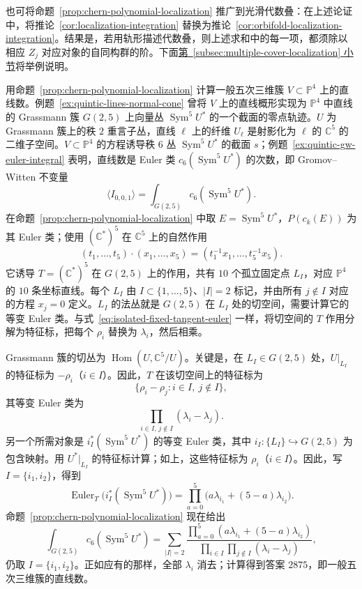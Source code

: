 也可将命题~\ref{prop:chern-polynomial-localization} 推广到光滑代数叠：在上述论证中，将推论~\ref{cor:localization-integration} 替换为推论~\ref{cor:orbifold-localization-integration}。结果是，若用轨形描述代数叠，则上述求和中的每一项，都须除以相应 $Z_j$ 对应对象的自同构群的阶。下面\hyperref[subsec:multiple-cover-localization]{第~\ref*{subsec:multiple-cover-localization} 小节}将举例说明。
\begin{example}\label{ex:quintic-lines-localization}
用命题~\ref{prop:chern-polynomial-localization} 计算一般五次三维簇 $V\subset\mathbb P^4$ 上的直线数。例题~\ref{ex:quintic-lines-normal-cone} 曾将 $V$ 上的直线概形实现为 $\mathbb P^4$ 中直线的 Grassmann 簇 $G(2,5)$ 上向量丛 $\operatorname{Sym}^5U^*$ 的一个截面的零点轨迹。$U$ 为 Grassmann 簇上的秩 $2$ 重言子丛，直线 $\ell$ 上的纤维 $U_\ell$ 是射影化为 $\ell$ 的 $\mathbb C^5$ 的二维子空间。$V\subset\mathbb P^4$ 的方程诱导秩 $6$ 丛 $\operatorname{Sym}^5U^*$ 的截面 $s$；例题~\ref{ex:quintic-gw-euler-integral} 表明，直线数是 Euler 类 $c_6(\operatorname{Sym}^5U^*)$ 的次数，即 Gromov--Witten 不变量
\[
\langle I_{0,0,1}\rangle=\int_{G(2,5)}c_6(\operatorname{Sym}^5U^*).
\]
在命题~\ref{prop:chern-polynomial-localization} 中取 $E=\operatorname{Sym}^5U^*$，$P(c_k(E))$ 为其 Euler 类；使用 $(\mathbb C^*)^5$ 在 $\mathbb C^5$ 上的自然作用
\[
(t_1,\ldots,t_5)\cdot(x_1,\ldots,x_5)=(t_1^{-1}x_1,\ldots,t_5^{-1}x_5).
\]
它诱导 $T=(\mathbb C^*)^5$ 在 $G(2,5)$ 上的作用，共有 $10$ 个孤立固定点 $L_I$，对应 $\mathbb P^4$ 的 $10$ 条坐标直线。每个 $L_I$ 由 $I\subset\{1,\ldots,5\}$、$|I|=2$ 标记，并由所有 $j\notin I$ 对应的方程 $x_j=0$ 定义。$L_I$ 的法丛就是 $G(2,5)$ 在 $L_I$ 处的切空间，需要计算它的等变 Euler 类。与式~\eqref{eq:isolated-fixed-tangent-euler} 一样，将切空间的 $T$ 作用分解为特征标，把每个 $\rho_i$ 替换为 $\lambda_i$，然后相乘。

Grassmann 簇的切丛为 $\operatorname{Hom}(U,\mathbb C^5/U)$。关键是，在 $L_I\in G(2,5)$ 处，$U|_{L_I}$ 的特征标为 $-\rho_i$（$i\in I$）。因此，$T$ 在该切空间上的特征标为
\[
\{\rho_i-\rho_j:i\in I,\ j\notin I\},
\]
其等变 Euler 类为
\[
\prod_{i\in I,\,j\notin I}(\lambda_i-\lambda_j).
\]
另一个所需对象是 $i_I^*(\operatorname{Sym}^5U^*)$ 的等变 Euler 类，其中 $i_I:\{L_I\}\hookrightarrow G(2,5)$ 为包含映射。用 $U^*|_{L_I}$ 的特征标计算；如上，这些特征标为 $\rho_i$（$i\in I$）。因此，写 $I=\{i_1,i_2\}$，得到
\[
\operatorname{Euler}_T\bigl(i_I^*(\operatorname{Sym}^5U^*)\bigr)
=\prod_{a=0}^5\bigl(a\lambda_{i_1}+(5-a)\lambda_{i_2}\bigr).
\]
命题~\ref{prop:chern-polynomial-localization} 现在给出
\[
\int_{G(2,5)}c_6(\operatorname{Sym}^5U^*)
=\sum_{|I|=2}\frac{\prod_{a=0}^5(a\lambda_{i_1}+(5-a)\lambda_{i_2})}{\prod_{i\in I}\prod_{j\notin I}(\lambda_i-\lambda_j)},
\]
仍取 $I=\{i_1,i_2\}$。正如应有的那样，全部 $\lambda_i$ 消去；计算得到答案 $2875$，即一般五次三维簇的直线数。
\end{example}
